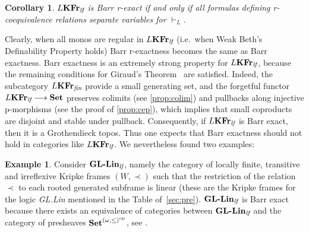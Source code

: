 \documentclass{article}
\newtheorem{cor}{Corollary}
\theoremstyle{definition}
\newtheorem{example}{Example}
\newcommand{\KFr}{\textup{\textbf{KFr}}}
\newcommand{\GLLin}{\textup{\textbf{GL-Lin}}}
\newcommand{\fin}{\textit{fin}}
\newcommand{\lf}{\textit{lf}}
\newcommand{\op}{\textup{op}}
\newcommand{\Set}{\textup{\textbf{Set}}}
\begin{document}
\begin{cor}
$L\KFr_\lf$ is Barr r-exact if and only if all formulas defining r-coequivalence relations separate variables for $\vdash_L$.
\end{cor}

Clearly, when all monos are regular in $L\KFr_\lf$ (i.e.\ when Weak Beth's Definability Property holds) Barr r-exactness becomes the same as Barr exactness. Barr exactness is an extremely strong property for $L\KFr_\lf$, because the remaining conditions for Giraud's Theorem~\cite[Theorem 1.4.5]{makkaireyes} are satisfied.
Indeed, the subcategory $L\KFr_\fin$ provide a small generating set, and the forgetful functor $L\KFr_\lf \longrightarrow \Set$ preserves colimits (see \cref{prop:colim}) and pullbacks along injective p-morphisms (see the proof of \cref{prop:cep}), which implies that small coproducts are disjoint and stable under pullback. Consequently, if $L\KFr_\lf$ is Barr exact, then it is a Grothendieck topos.
Thus one expects that Barr exactness should not hold in categories like $L\KFr_\lf$. We nevertheless found two examples:

\begin{example}\label{ex:gllin}
Consider  $\GLLin_\lf$, namely the category  of  locally finite, transitive and irreflexive Kripke frames  $(W,\prec)$ such that  the restriction of the relation $\prec$ to each rooted generated subframe is  linear  (these are the Kripke frames for the logic \emph{GL.Lin} mentioned in the Table of~\cref{sec:pre}). $\GLLin_\lf$ is Barr exact because there exists an equivalence of categories between $\GLLin_\lf$ and the category of presheaves $\Set^{(\omega,\leq)^\op}$, see \cite{Copr}.
\end{example}
\end{document}
